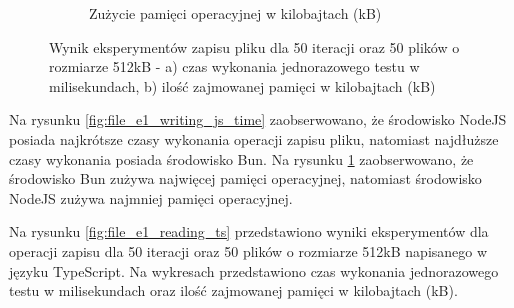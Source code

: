 \begin{figure}[H]
\begin{subfigure}[b]{0.44\textwidth}
    \caption{Zużycie pamięci operacyjnej w kilobajtach (kB)}
    \label{fig:file_e1_writing_js_memory}
  \end{subfigure}
  \hfill
  \caption{Wynik eksperymentów zapisu pliku dla 50 iteracji oraz 50 plików o rozmiarze 512kB - a) czas wykonania jednorazowego testu w milisekundach, b) ilość zajmowanej pamięci w kilobajtach (kB)}
  \label{fig:file_e1_writing_js}
\end{figure}

Na rysunku \ref{fig:file_e1_writing_js_time} zaobserwowano, że środowisko NodeJS posiada najkrótsze czasy wykonania operacji zapisu pliku, natomiast najdłuższe czasy wykonania posiada środowisko Bun. Na rysunku \ref{fig:file_e1_writing_js_memory} zaobserwowano, że środowisko Bun zużywa najwięcej pamięci operacyjnej, natomiast środowisko NodeJS zużywa najmniej pamięci operacyjnej.

Na rysunku \ref{fig:file_e1_reading_ts} przedstawiono wyniki eksperymentów dla operacji zapisu dla 50 iteracji oraz 50 plików o rozmiarze 512kB napisanego w języku TypeScript. Na wykresach przedstawiono czas wykonania jednorazowego testu w milisekundach oraz ilość zajmowanej pamięci w kilobajtach (kB).

